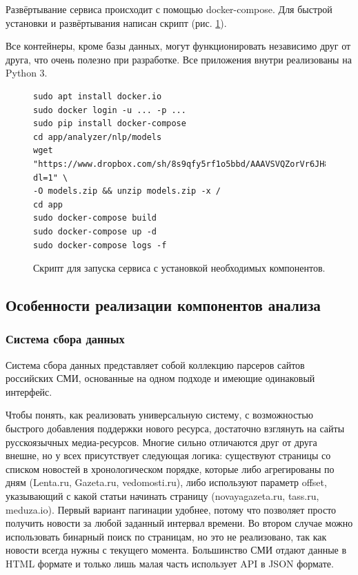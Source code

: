 \documentclass[a4paper, 14pt]{extarticle}
\begin{document}
Развёртывание сервиса происходит с помощью docker-compose. Для быстрой установки и развёртывания написан скрипт (рис. \ref{bash}).

Все контейнеры, кроме базы данных, могут функционировать независимо друг от друга, что очень полезно при разработке. Все приложения внутри реализованы на Python 3.

\begin{figure}
	\centering
\begin{verbatim}
sudo apt install docker.io
sudo docker login -u ... -p ...
sudo pip install docker-compose
cd app/analyzer/nlp/models
wget "https://www.dropbox.com/sh/8s9qfy5rf1o5bbd/AAAVSVQZorVr6JH8LPJQX9tva?dl=1" \
-O models.zip && unzip models.zip -x /
cd app
sudo docker-compose build
sudo docker-compose up -d
sudo docker-compose logs -f
\end{verbatim}
	\caption{Скрипт для запуска сервиса с установкой необходимых компонентов.}
	\label{bash}
\end{figure}


\subsection{Особенности реализации компонентов анализа}
\subsubsection{Система сбора данных}

Система сбора данных представляет собой коллекцию парсеров сайтов российских СМИ, основанные на одном подходе и имеющие одинаковый интерфейс.

Чтобы понять, как реализовать универсальную систему, с возможностью быстрого добавления поддержки нового ресурса, достаточно взглянуть на сайты русскоязычных медиа-ресурсов. Многие сильно отличаются друг от друга внешне, но у всех присутствует следующая логика: существуют страницы со списком новостей в хронологическом порядке, которые либо агрегированы по дням (Lenta.ru, Gazeta.ru, vedomosti.ru), либо используют параметр offset, указывающий с какой статьи начинать страницу (novayagazeta.ru, tass.ru, meduza.io). Первый вариант пагинации удобнее, потому что позволяет просто получить новости за любой заданный интервал времени. Во втором случае можно использовать бинарный поиск по страницам, но это не реализовано, так как новости всегда нужны с текущего момента.
Большинство СМИ отдают данные в HTML формате и только лишь малая часть использует API в JSON формате.
\end{document}
